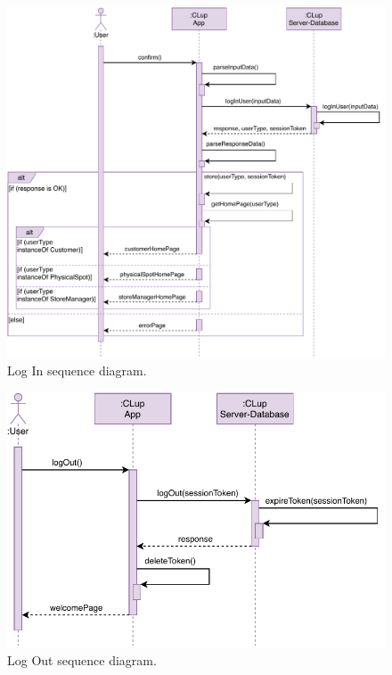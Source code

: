 \begin{figure}[H]
	\centering
	\includegraphics[width=1.0\textwidth]{images/logIn_sequence_diagram.pdf}
	\caption{Log In sequence diagram.}
\end{figure}

\begin{figure}[H]
	\centering
	\includegraphics[width=1.0\textwidth]{images/logOut_sequence_diagram.pdf}
	\caption{Log Out sequence diagram.}
\end{figure}

